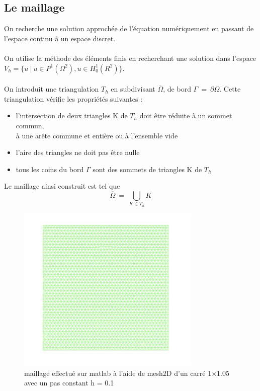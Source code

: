\documentclass[a4paper,12pt,titlepage]{report}
\begin{document}
\begin{onehalfspace}
\subsection{Le maillage}
On recherche une solution approchée de l'équation numériquement en passant de l'espace continu à un espace discret. \\
\\
On utilise la méthode des éléments finis en recherchant une solution dans l'espace 
$V_{h} = \{u \ | \ u \in P^{1}(\Omega^{2}), u \in H^{1}_{0}(R^{2})\}$. \\
\\
On introduit une triangulation $T_{h}$ en subdivisant $\overline{\Omega}$, de bord $\Gamma \ = \ \partial\Omega$. 
Cette triangulation vérifie les propriétés suivantes :
\\
\begin{itemize}
  \item l’intersection de deux triangles K de $T_{h}$ doit être réduite à un sommet commun,\\ à une arête commune et entière ou à l'ensemble vide
  \item l’aire des triangles ne doit pas être nulle
  \item tous les coins du bord $\Gamma$ sont des sommets de triangles K de $T_{h}$
\end{itemize}

Le maillage ainsi construit est tel que
\[
\overline{\Omega} \ = \ \bigcup_{K \in T_{h}} K 
\]
\begin{figure}[h]
\begin{center}
\includegraphics[height = 8cm, keepaspectratio]{graphes/Maillage_initial.png} 
\caption{\label{figure 3 } maillage effectué sur matlab à l'aide de mesh2D d'un carré 1$\times$1.05 avec un pas constant h = 0.1}
\end{center}
\end{figure}


\end{onehalfspace}
\end{document}
